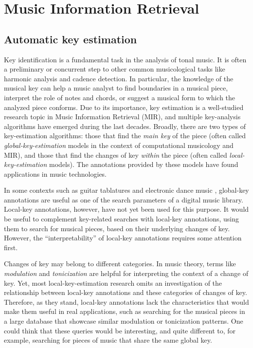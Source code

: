 \section{Music Information Retrieval}
\subsection{Automatic key estimation}

Key identification is a fundamental task in the analysis of tonal music.
It is often a preliminary or concurrent step to other common musicological tasks like harmonic analysis and cadence detection.
In particular, the knowledge of the musical key can help a music analyst to find boundaries in a musical piece, interpret the role of notes and chords, or suggest a musical form to which the analyzed piece conforms.
Due to its importance, key estimation is a well-studied research topic in Music Information Retrieval (MIR), and multiple key-analysis algorithms have emerged during the last decades.
Broadly, there are two types of key-estimation algorithms: those that find the \emph{main key} of the piece (often called \emph{global-key-estimation} models in the context of computational musicology and MIR), and those that find the changes of key \emph{within} the piece (often called \emph{local-key-estimation} models). The annotations provided by these models have found applications in music technologies.

In some contexts such as guitar tablatures \cite{ultimateguitar} and electronic dance music \cite{gomez_tonal_2006}, global-key annotations are useful as one of the search parameters of a digital music library.
Local-key annotations, however, have not yet been used for this purpose.
It would be useful to complement key-related searches with local-key annotations, using them to search for musical pieces, based on their underlying changes of key.
However, the ``interpretability'' of local-key annotations requires some attention first.

Changes of key may belong to different categories.
In music theory, terms like \emph{modulation} and \emph{tonicization} are helpful for interpreting the context of a change of key.
Yet, most local-key-estimation research omits an investigation of the relationship between local-key annotations and these categories of changes of key.
Therefore, as they stand, local-key annotations lack the characteristics that would make them useful in real applications, such as searching for the musical pieces in a large database that showcase similar modulation or tonicization patterns.
One could think that these queries would be interesting, and quite different to, for example, searching for pieces of music that share the same global key.

